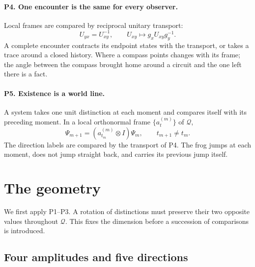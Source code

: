 \documentclass[aps,prx,reprint,longbibliography]{revtex4-2}
\begin{document}
\paragraph*{P4. One encounter is the same for every observer.}
Local frames are compared by reciprocal unitary transport:
\begin{equation}
 U_{yx}=U_{xy}^{-1},\qquad
 U_{xy}\mapsto g_xU_{xy}g_y^{-1}.
 \label{eq:transport}
\end{equation}
A complete encounter contracts its endpoint states with the transport, or takes a trace around a closed history. Where a compass points changes with its frame; the angle between the compass brought home around a circuit and the one left there is a fact.

\paragraph*{P5. Existence is a world line.}
A system takes one unit distinction at each moment and compares itself with its preceding moment. In a local orthonormal frame $\{a_t^{(m)}\}$ of $\mathscr Q$,
\begin{equation}
 \Psi_{m+1}=(a_{t_m}^{(m)}\otimes I)\Psi_m,
 \qquad t_{m+1}\ne t_m.
 \label{eq:postulate-step}
\end{equation}
The direction labels are compared by the transport of P4. The frog jumps at each moment, does not jump straight back, and carries its previous jump itself.

\section{The geometry}
\label{sec:geometry}

We first apply P1--P3. A rotation of distinctions must preserve their two opposite values throughout $\mathscr Q$. This fixes the dimension before a succession of comparisons is introduced.

\subsection{Four amplitudes and five directions}
\end{document}
